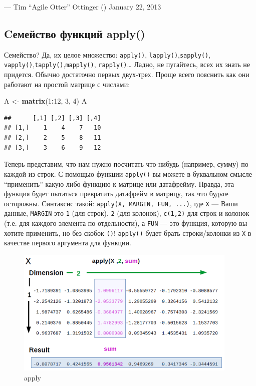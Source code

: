 \documentclass[]{book}
\newenvironment{Shaded}{\begin{snugshade}}{\end{snugshade}}
\newcommand{\KeywordTok}[1]{\textcolor[rgb]{0.13,0.29,0.53}{\textbf{#1}}}
\newcommand{\DecValTok}[1]{\textcolor[rgb]{0.00,0.00,0.81}{#1}}
\newcommand{\StringTok}[1]{\textcolor[rgb]{0.31,0.60,0.02}{#1}}
\newcommand{\OperatorTok}[1]{\textcolor[rgb]{0.81,0.36,0.00}{\textbf{#1}}}
\newcommand{\NormalTok}[1]{#1}
\begin{document}
--- Tim ``Agile Otter'' Ottinger (\citet{tottinge}) January 22, 2013

\subsection{Cемейство функций apply()}\label{apply}

Семейство? Да, их целое множество: \texttt{apply()},
\texttt{lapply()},\texttt{sapply()},
\texttt{vapply()},\texttt{tapply()},\texttt{mapply()},
\texttt{rapply()}\ldots{} Ладно, не пугайтесь, всех их знать не
придется. Обычно достаточно первых двух-трех. Проще всего пояснить как
они работают на простой матрице с числами:

\begin{Shaded}
\begin{Highlighting}[]
\NormalTok{A <-}\StringTok{ }\KeywordTok{matrix}\NormalTok{(}\DecValTok{1}\OperatorTok{:}\DecValTok{12}\NormalTok{, }\DecValTok{3}\NormalTok{, }\DecValTok{4}\NormalTok{)}
\NormalTok{A }
\end{Highlighting}
\end{Shaded}

\begin{verbatim}
##      [,1] [,2] [,3] [,4]
## [1,]    1    4    7   10
## [2,]    2    5    8   11
## [3,]    3    6    9   12
\end{verbatim}

Теперь представим, что нам нужно посчитать что-нибудь (например, сумму)
по каждой из строк. С помощью функции \texttt{apply()} вы можете в
буквальном смысле ``применить'' какую либо функцию к матрице или
датафрейму. Правда, эта функция будет пытаться превратить датафрейм в
матрицу, так что будьте осторожны. Синтаксис такой:
\texttt{apply(X,\ MARGIN,\ FUN,\ ...)}, где \texttt{X} --- Ваши данные,
\texttt{MARGIN} это \texttt{1} (для строк), \texttt{2} (для колонок),
\texttt{c(1,2)} для строк и колонок (т.е. для каждого элемента по
отдельности), а \texttt{FUN} --- это функция, которую вы хотите
применить, но без скобок \texttt{()}! \texttt{apply()} будет брать
строки/колонки из \texttt{X} в качестве первого аргумента для функции.

\begin{figure}
\centering
\includegraphics[width=4.16667in]{images/Apply_function.png}
\caption{apply}
\end{figure}
\end{document}
